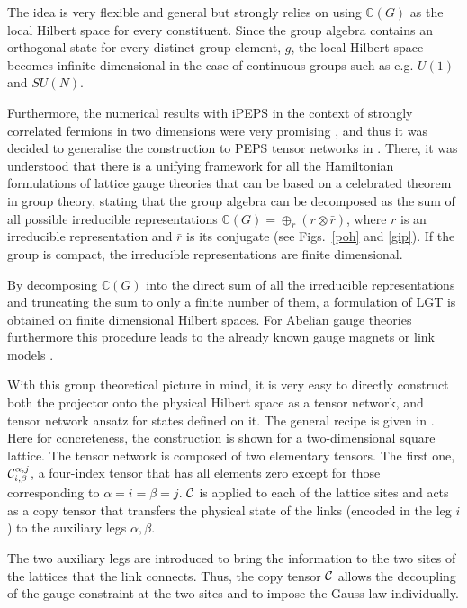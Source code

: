 \documentclass[epj,final]{svjour}
\begin{document}
The idea \cite{Tagliacozzo2011} is very flexible and general but  strongly relies on using $\mathbb{C}(G)$ as the local Hilbert space for every constituent. Since the  group algebra contains an orthogonal state for every distinct group element, $g$, the local Hilbert space  becomes infinite dimensional in the case of continuous groups such as e.g. $U(1)$ and $SU(N)$.

Furthermore, the numerical results with iPEPS in the context of strongly correlated fermions in two dimensions were very promising \cite{corboz_competing_2014}, and thus it was decided to generalise the construction to PEPS tensor networks in \cite{tagliacozzo2014tensor}. There, it was understood that there is a unifying framework for all the Hamiltonian  formulations of lattice gauge theories that can be  based on a celebrated theorem in group theory, stating that the group algebra can be decomposed as the sum of all possible irreducible representations  $\mathbb{C}(G) = {\oplus_r}( r\otimes \bar{r} )$, where $r$ is an irreducible representation and $\bar{r}$ is its conjugate (see Figs.~\ref{poh} and \ref{gip}).  If the group is compact, the irreducible representations are finite dimensional. 

By decomposing $\mathbb{C}(G)$ into the direct sum of all the irreducible representations and truncating the sum to only a finite number of them, a formulation of LGT is obtained on finite dimensional Hilbert spaces. For Abelian gauge theories furthermore this procedure \cite{tagliacozzo2013optical} leads to the already known gauge magnets or link models \cite{horn_finite_1981,Orland1990,Chandrasekharan:1996ih}.

With this group theoretical picture in mind, it is very easy to directly construct both the projector onto the physical Hilbert space as a tensor network, and tensor network ansatz for states defined on it. The general recipe is given in \cite{tagliacozzo2014tensor}. Here for concreteness, the construction is shown for a two-dimensional square lattice. The tensor network is composed of two elementary tensors. The first one, ${\cal C}^{\alpha, j}_{i, \beta}$, a four-index tensor that has all elements zero except for those corresponding to $\alpha =  i =   \beta = j$. ${\cal C}$ is applied to each of the lattice sites and acts as a copy tensor that transfers the physical state of the links (encoded in the leg $i$) to the auxiliary legs $\alpha, \beta$.

The two auxiliary legs are introduced to bring the information to the two sites of the lattices that the link connects. Thus, the copy tensor ${\cal C}$ allows the decoupling of the gauge constraint at the two sites and to impose the Gauss law individually.
\end{document}
